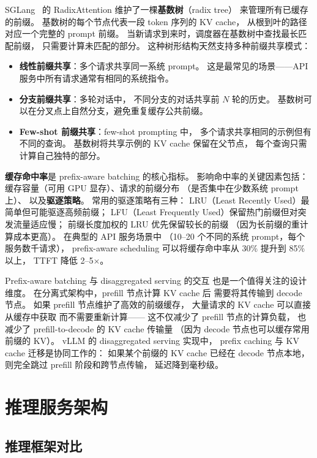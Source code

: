 SGLang~\cite{zheng2024sglang} 的 RadixAttention
维护了一棵\textbf{基数树}（radix tree）
来管理所有已缓存的前缀。
基数树的每个节点代表一段 token 序列的 KV cache，
从根到叶的路径对应一个完整的 prompt 前缀。
当新请求到来时，调度器在基数树中查找最长匹配前缀，
只需要计算未匹配的部分。
这种树形结构天然支持多种前缀共享模式：
\begin{itemize}[noitemsep]
  \item \textbf{线性前缀共享}：多个请求共享同一系统 prompt。
        这是最常见的场景——API 服务中所有请求通常有相同的系统指令。
  \item \textbf{分支前缀共享}：多轮对话中，
        不同分支的对话共享前 $N$ 轮的历史。
        基数树可以在分叉点上自然分支，避免重复缓存公共前缀。
  \item \textbf{Few-shot 前缀共享}：few-shot prompting 中，
        多个请求共享相同的示例但有不同的查询。
        基数树将共享示例的 KV cache 保留在父节点，
        每个查询只需计算自己独特的部分。
\end{itemize}

\textbf{缓存命中率}是 prefix-aware batching 的核心指标。
影响命中率的关键因素包括：
缓存容量（可用 GPU 显存）、请求的前缀分布
（是否集中在少数系统 prompt 上）、
以及\textbf{驱逐策略}。
常用的驱逐策略有三种：
LRU（Least Recently Used）最简单但可能驱逐高频前缀；
LFU（Least Frequently Used）保留热门前缀但对突发流量适应慢；
前缀长度加权的 LRU 优先保留较长的前缀
（因为长前缀的重计算成本更高）。
在典型的 API 服务场景中
（10--20 个不同的系统 prompt，每个服务数千请求），
prefix-aware scheduling 可以将缓存命中率从 30\% 提升到 85\% 以上，
TTFT 降低 2--5$\times$。

Prefix-aware batching 与 disaggregated serving 的交互
也是一个值得关注的设计维度。
在分离式架构中，prefill 节点计算 KV cache 后
需要将其传输到 decode 节点。
如果 prefill 节点维护了高效的前缀缓存，
大量请求的 KV cache 可以直接从缓存中获取
而不需要重新计算——
这不仅减少了 prefill 节点的计算负载，
也减少了 prefill-to-decode 的 KV cache 传输量
（因为 decode 节点也可以缓存常用前缀的 KV）。
vLLM 的 disaggregated serving 实现中，
prefix caching 与 KV cache 迁移是协同工作的：
如果某个前缀的 KV cache 已经在 decode 节点本地，
则完全跳过 prefill 阶段和跨节点传输，
延迟降到毫秒级。


\section{推理服务架构}

\subsection{推理框架对比}


